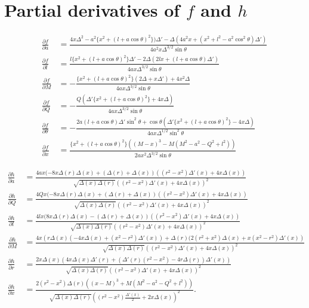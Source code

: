 \section{Partial derivatives of $f$ and $h$}\label{app:B}
\begin{subequations}
\begin{align}
\frac{\partial f}{\partial a}&= \frac{ 4x \Delta^2 -a^2\{x^2 +(l+a \cos  \theta )^2\}) \Delta' -\Delta(4a^2 x  + (x^2+l^2-a^2 \cos^2 \theta )\Delta')}{4 a^2 x \Delta^{3/2}\sin \theta }\\
\frac{\partial f}{\partial l}&= \frac{ l \{x^2 +(l+a \cos  \theta )^2\} \Delta' -2\Delta(2l x  + (l+a \cos \theta )\Delta')}{4 a x \Delta^{3/2}\sin \theta }\\
\frac{\partial f}{\partial M}&= -\frac{\{x^2 +(l+a \cos  \theta )^2\}(2\Delta + x \Delta') +4 x^2 \Delta}{4 a x \Delta^{3/2}\sin \theta }\\
\frac{\partial f}{\partial Q}&= -\frac{Q(\Delta'\{x^2 +(l+a \cos  \theta )^2\}+4 x \Delta)}{4ax\Delta^{3/2} \sin \theta }\\
\frac{\partial f}{\partial \theta}&=-\frac{2a (l+a\cos \theta ) \Delta'\sin^2 \theta + \cos \theta (\Delta'\{x^2 +(l+a \cos  \theta )^2\}-4 x \Delta)}{4 a x \Delta ^{1/2}\sin^2 \theta }\\ \label{eq:fxder}
\frac{\partial f}{\partial x}&=\frac{\{x^2 + (l+a \cos  \theta )^2\}((M-x)^3-M(M^2-a^2-Q^2+l^2))}{2 a x^2 \Delta^{3/2}\sin \theta }
\end{align}
\end{subequations} 

\begin{subequations}
\begin{align}
\frac{\partial h}{\partial a}&=\frac{4a x(-8 x \Delta(r)\Delta(x)+ (\Delta(r)+\Delta(x))((r^2-x^2)\Delta'(x)+4x\Delta(x)) }{\sqrt{\Delta(x)\Delta(r)}((r^2-x^2)\Delta'(x)+4x\Delta(x))^2}\\
\frac{\partial h}{\partial Q}&=\frac{4Q x(-8 x \Delta(r)\Delta(x)+ (\Delta(r)+\Delta(x))((r^2-x^2)\Delta'(x)+4x\Delta(x)) }{\sqrt{\Delta(x)\Delta(r)}((r^2-x^2)\Delta'(x)+4x\Delta(x))^2}\\
\frac{\partial h}{\partial l}&=\frac{4l x(8 x \Delta(r)\Delta(x)- (\Delta(r)+\Delta(x))((r^2-x^2)\Delta'(x)+4x\Delta(x)) }{\sqrt{\Delta(x)\Delta(r)}((r^2-x^2)\Delta'(x)+4x\Delta(x))^2}\\
\frac{\partial h}{\partial M}&=\frac{4x\left(r\Delta(x)(-4x\Delta(x)+(x^2-r^2)\Delta'(x)) + \Delta(r)(2(r^2+x^2)\Delta(x)+x(x^2-r^2)\Delta'(x)\right) }{\sqrt{\Delta(x)\Delta(r)}((r^2-x^2)\Delta'(x)+4x\Delta(x))^2}\\
\frac{\partial h}{\partial r}&=\frac{2 x\Delta(x)(4x\Delta(x)\Delta'(r)+(\Delta'(r)(r^2-x^2)-4r\Delta(r))\Delta'(x)) }{\sqrt{\Delta(x)\Delta(r)}((r^2-x^2)\Delta'(x)+4x\Delta(x))^2}\\\label{eq:hxder}
\frac{\partial h}{\partial x}&= \frac{2(r^2-x^2)\Delta(r)((x-M)^3+ M(M^2-a^2-Q^2 +l^2))}{\sqrt{\Delta(x)\Delta(r)}((r^2-x^2)\frac{\Delta'(x)}{2}+2x\Delta(x))^2} .
\end{align}
\end{subequations} 